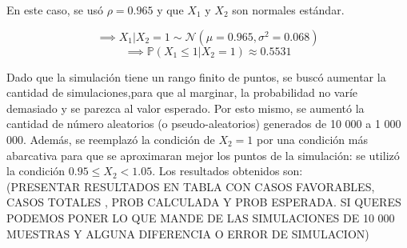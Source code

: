 \documentclass{article}
\begin{document}
En este caso, se usó $\rho=0.965$  y que $X_1$ y $X_2$ son normales estándar. 

\[\implies X_1|X_2=1 \sim \mathcal{N}(\mu=0.965 , \sigma^2 = 0.068) \]
\[\implies \mathbb{P}(X_1 \leq 1|X_2=1) \approx 0.5531 \]

Dado que la simulación tiene un rango finito de puntos, se buscó aumentar la cantidad de simulaciones,para que al marginar, la probabilidad no varíe  demasiado y se parezca al valor esperado. Por esto mismo, se aumentó la cantidad de número aleatorios (o pseudo-aleatorios) generados de 10 000 a 1 000 000. Además, se reemplazó la condición de $X_2 = 1$ por una condición más abarcativa para que se aproximaran mejor los puntos de la simulación: se utilizó la condición $0.95 \leq X_2 < 1.05$. Los resultados obtenidos son:\\

(PRESENTAR RESULTADOS EN TABLA CON CASOS FAVORABLES, CASOS TOTALES , PROB CALCULADA Y PROB ESPERADA. SI QUERES PODEMOS PONER LO QUE MANDE DE LAS SIMULACIONES DE 10 000 MUESTRAS Y ALGUNA DIFERENCIA O ERROR DE SIMULACION)
\end{document}
